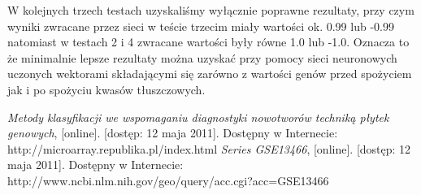 \documentclass{classrep}
\begin{document}
W kolejnych trzech testach uzyskaliśmy wyłącznie poprawne rezultaty, przy czym wyniki zwracane przez sieci w teście trzecim miały wartości ok. 0.99 lub -0.99 natomiast w testach 2 i 4 zwracane wartości były równe 1.0 lub -1.0. Oznacza to że minimalnie lepsze rezultaty można uzyskać przy pomocy sieci neuronowych uczonych wektorami składającymi się zarówno z wartości genów przed spożyciem jak i po spożyciu kwasów tłuszczowych.

\begin{thebibliography}{0}
\textit{Metody klasyfikacji we wspomaganiu diagnostyki nowotworów techniką płytek genowych}, [online]. [dostęp: 12 maja
2011]. Dostępny w Internecie: http://microarray.republika.pl/index.html
\textit{Series GSE13466}, [online]. [dostęp: 12 maja 2011].
Dostępny w Internecie: http://www.ncbi.nlm.nih.gov/geo/query/acc.cgi?acc=GSE13466
\end{thebibliography}
\end{document}
